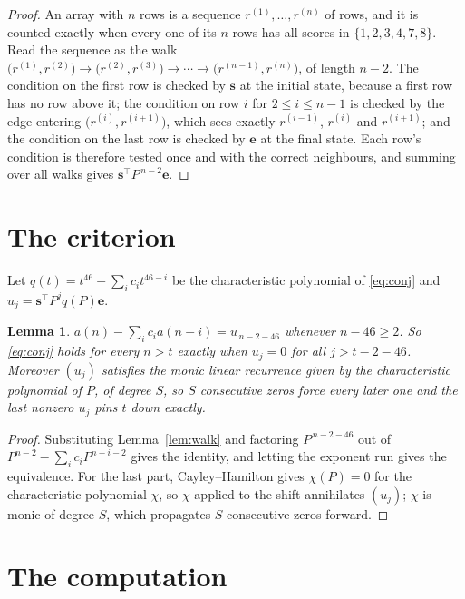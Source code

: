 \documentclass[11pt,a4paper]{article}
\theoremstyle{plain}
\newtheorem{lemma}[theorem]{Lemma}
\theoremstyle{definition}
\begin{document}
\begin{proof}
An array with $n$ rows is a sequence $r^{(1)},\dots,r^{(n)}$ of rows, and it is counted
exactly when every one of its $n$ rows has all scores in $\{1,2,3,4,7,8\}$. Read the sequence as the
walk $\bigl(r^{(1)},r^{(2)}\bigr)\to\bigl(r^{(2)},r^{(3)}\bigr)\to\cdots\to
\bigl(r^{(n-1)},r^{(n)}\bigr)$, of length $n-2$. The condition on the first row is
checked by $\mathbf{s}$ at the initial state, because a first row has no row above it; the
condition on row $i$ for $2\le i\le n-1$ is checked by the edge entering
$\bigl(r^{(i)},r^{(i+1)}\bigr)$, which sees exactly $r^{(i-1)}$, $r^{(i)}$ and
$r^{(i+1)}$; and the condition on the last row is checked by $\mathbf{e}$ at the final
state. Each row's condition is therefore tested once and with the correct neighbours, and
summing over all walks gives $\mathbf{s}^{\!\top}P^{\,n-2}\mathbf{e}$.
\end{proof}

\section{The criterion}

Let $q(t)=t^{46}-\sum_i c_i t^{46-i}$ be the characteristic polynomial of
\eqref{eq:conj} and $u_j=\mathbf{s}^{\!\top}P^{j}q(P)\mathbf{e}$.

\begin{lemma}\label{lem:crit}
$a(n)-\sum_i c_i a(n-i)=u_{\,n-2-46}$ whenever $n-46\ge2$. So \eqref{eq:conj}
holds for every $n>t$ exactly when $u_j=0$ for all $j>t-2-46$. Moreover $(u_j)$
satisfies the monic linear recurrence given by the characteristic polynomial of $P$, of
degree $S$, so $S$ consecutive zeros force every later one and the last nonzero $u_j$ pins
$t$ down exactly.
\end{lemma}

\begin{proof}
Substituting Lemma~\ref{lem:walk} and factoring $P^{\,n-2-46}$ out of
$P^{n-2}-\sum_i c_i P^{n-i-2}$ gives the identity, and letting the exponent run gives the
equivalence. For the last part, Cayley--Hamilton gives $\chi(P)=0$ for the characteristic
polynomial $\chi$, so $\chi$ applied to the shift annihilates $(u_j)$; $\chi$ is monic of
degree $S$, which propagates $S$ consecutive zeros forward.
\end{proof}

\section{The computation}
\end{document}
